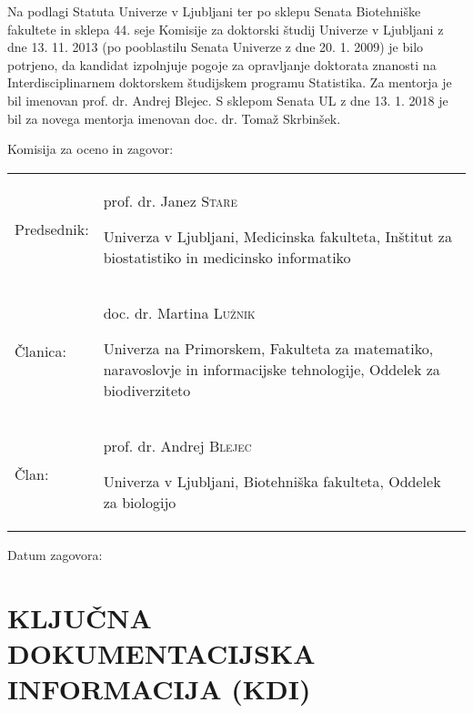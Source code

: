 Na podlagi Statuta Univerze v Ljubljani ter po sklepu Senata Biotehniške fakultete in sklepa 44. seje Komisije za doktorski študij Univerze v Ljubljani z dne 13. 11. 2013 (po pooblastilu Senata Univerze z dne 20. 1. 2009) je bilo potrjeno, da kandidat izpolnjuje pogoje za opravljanje doktorata znanosti na Interdisciplinarnem doktorskem študijskem programu Statistika. Za mentorja je bil imenovan prof. dr. Andrej Blejec. S sklepom Senata UL z dne 13. 1. 2018 je bil za novega mentorja imenovan doc. dr. Tomaž Skrbinšek.

\vspace{4cm}

Komisija za oceno in zagovor:\\

\begin{table}[!ht] %
 \begin{tabular}{>{\raggedright} m{4cm} m{10cm}}
   Predsednik: & prof. dr. Janez \textsc{Stare} \par Univerza v Ljubljani, Medicinska fakulteta, Inštitut za biostatistiko in medicinsko informatiko \\ [10pt]
   Članica: & doc. dr. Martina \textsc{Lužnik} \par Univerza na Primorskem, Fakulteta za matematiko, naravoslovje in informacijske tehnologije, Oddelek za biodiverziteto \\ [10pt]
   Član: & prof. dr. Andrej \textsc{Blejec} \par Univerza v Ljubljani, Biotehniška fakulteta, Oddelek za biologijo \\ [10pt]
 \end{tabular}
\end{table}

\vspace{3cm}

Datum zagovora:

\begin{flushright}
\avtor
\end{flushright}

\newpage
\section*{KLJUČNA DOKUMENTACIJSKA INFORMACIJA (KDI)}

\newcommand{\numroman}{X}
\newcommand{\numpages}{56}
\newcommand{\numtables}{1}
\newcommand{\numfigs}{11}
\newcommand{\numsources}{66}

